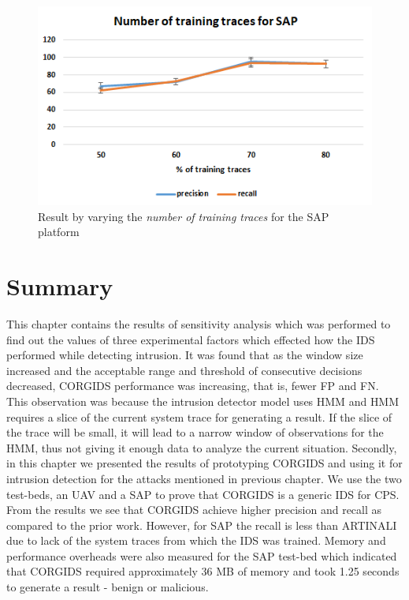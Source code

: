 \begin{itemize}
\begin{figure}[ht]
    \centering
    \includegraphics[scale=0.75,keepaspectratio = true]{Graphics/SAP_traces.png}
    \caption{Result by varying the \textit{number of training traces} for the SAP platform}
    \label{fig:SAP_traces}
\end{figure}

\end{itemize}

\section{Summary}

This chapter contains the results of sensitivity analysis which was performed to find out the values of three experimental factors which effected how the \ac{IDS} performed while detecting intrusion. It was found that as the window size increased and the acceptable range and threshold of consecutive decisions decreased, \ac{CORGIDS} performance was increasing, that is, fewer \ac{FP} and \ac{FN}. This observation was because the intrusion detector model uses \ac{HMM} and \ac{HMM} requires a slice of the current system trace for generating a result. If the slice of the trace will be small, it will lead to a narrow window of observations for the \ac{HMM}, thus not giving it enough data to analyze the current situation. Secondly, in this chapter we presented the results of prototyping \ac{CORGIDS} and using it for intrusion detection for the attacks mentioned in previous chapter. We use the two test-beds, an \ac{UAV} and a \ac{SAP} to prove that \ac{CORGIDS} is a generic IDS for \ac{CPS}. From the results we see that \ac{CORGIDS} achieve higher precision and recall as compared to the prior work. However, for \ac{SAP} the recall is less than ARTINALI due to lack of the system traces from which the \ac{IDS} was trained. Memory and performance overheads were also measured for the \ac{SAP} test-bed which indicated that \ac{CORGIDS} required approximately 36 MB of memory and took 1.25 seconds to generate a result - benign or malicious.

\endinput
=====================================================================
